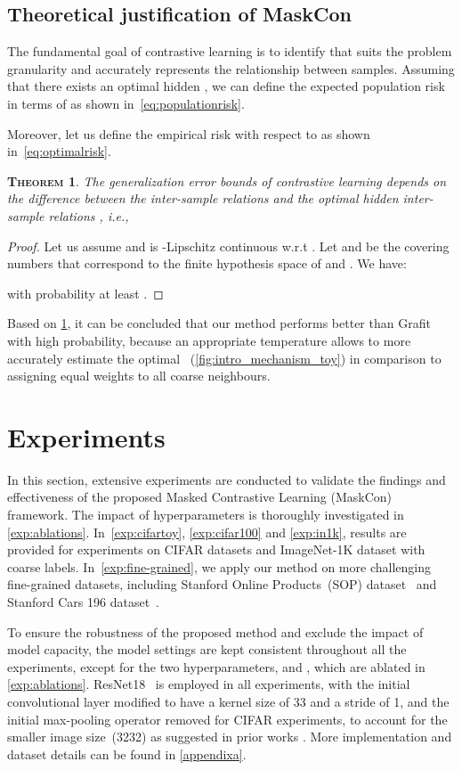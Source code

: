 \documentclass[10pt,twocolumn,letterpaper]{article}
\newtheorem{theorem}{\textsc{Theorem}}
\begin{document}
\subsection{Theoretical justification of MaskCon}
The fundamental goal of contrastive learning is to identify  that suits the problem granularity and accurately represents the relationship between samples. Assuming that there exists an optimal hidden , we can define the expected population risk in terms of  as shown in~\cref{eq:populationrisk}. 

Moreover, let us define the empirical risk with respect to  as shown in~\cref{eq:optimalrisk}.


\begin{theorem}\label{theorem1}
The generalization error bounds of contrastive learning depends on the difference between the inter-sample relations  and the optimal hidden inter-sample relations , i.e.,

\end{theorem}
\begin{proof}
Let us assume  and is -Lipschitz continuous w.r.t . Let  and  be the covering numbers that correspond to the finite hypothesis space of  and .
We have:

with probability at least .
\end{proof}

Based on \cref{theorem1}, it can be concluded that our method performs better than Grafit with high probability, because an appropriate temperature  allows  to more accurately estimate the optimal ~(\cref{fig:intro_mechanism_toy}) in comparison to assigning equal weights to all coarse neighbours.

\section{Experiments}
In this section, extensive experiments are conducted to validate the findings and effectiveness of the proposed Masked Contrastive Learning (MaskCon) framework. The impact of hyperparameters is thoroughly investigated in \cref{exp:ablations}.
In~\cref{exp:cifartoy}, \cref{exp:cifar100} and \cref{exp:in1k}, results are provided for experiments on CIFAR datasets and ImageNet-1K dataset with coarse labels. In~\cref{exp:fine-grained}, we apply our method on more challenging fine-grained datasets, including Stanford Online Products~(SOP) dataset~\cite{sopdataset} and Stanford Cars 196 dataset~\cite{cars196}. 

To ensure the robustness of the proposed method and exclude the impact of model capacity, the model settings are kept consistent throughout all the experiments, except for the two hyperparameters,  and , which are ablated in \cref{exp:ablations}.
ResNet18~\cite{resnet} is employed in all experiments, with the initial convolutional layer modified to have a kernel size of 33 and a stride of 1, and the initial max-pooling operator removed for CIFAR experiments, to account for the smaller image size~(3232) as suggested in prior works \cite{moco}. More implementation and dataset details can be found in \cref{appendixa}.
\end{document}
